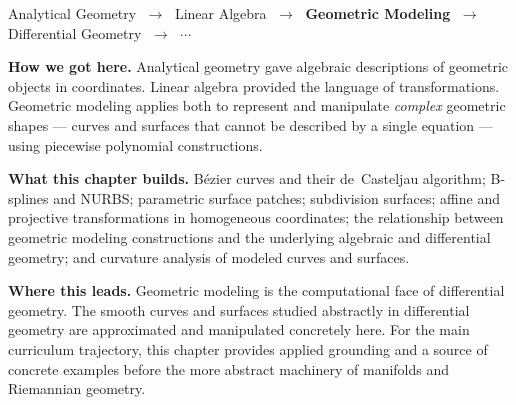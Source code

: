 
\begin{tcolorbox}[
  colback=gray!6,
  colframe=gray!40,
  arc=2pt,
  left=8pt, right=8pt, top=6pt, bottom=6pt,
  title={\small\textbf{Where You Are in the Journey}},
  fonttitle=\small\bfseries
]
\begin{center}
\small
Analytical Geometry
$\;\to\;$ Linear Algebra
$\;\to\;$ \textbf{Geometric Modeling}
$\;\to\;$ Differential Geometry
$\;\to\;$ $\cdots$
\end{center}

\medskip
\noindent\textbf{How we got here.}
Analytical geometry gave algebraic descriptions of geometric
objects in coordinates.
Linear algebra provided the language of transformations.
Geometric modeling applies both to represent and manipulate
\emph{complex} geometric shapes --- curves and surfaces that
cannot be described by a single equation --- using piecewise
polynomial constructions.

\medskip
\noindent\textbf{What this chapter builds.}
B\'ezier curves and their de~Casteljau algorithm; B-splines and
NURBS; parametric surface patches; subdivision surfaces;
affine and projective transformations in homogeneous
coordinates; the relationship between geometric modeling
constructions and the underlying algebraic and differential
geometry; and curvature analysis of modeled curves and surfaces.

\medskip
\noindent\textbf{Where this leads.}
Geometric modeling is the computational face of differential
geometry.
The smooth curves and surfaces studied abstractly in differential
geometry are approximated and manipulated concretely here.
For the main curriculum trajectory, this chapter provides
applied grounding and a source of concrete examples before the
more abstract machinery of manifolds and Riemannian geometry.
\end{tcolorbox}
\vspace{1em}

